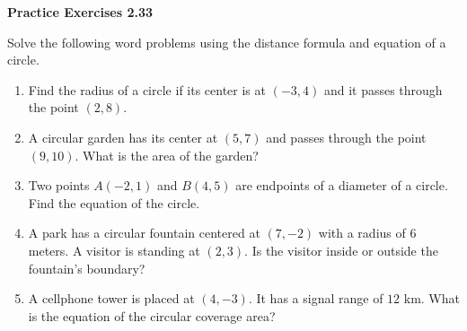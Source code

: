 \vspace{0.3ex}
\noindent\textbf{Practice Exercises 2.33}

\vspace{0.2ex}

Solve the following word problems using the distance formula and equation of a circle.

\begin{enumerate}
    \item Find the radius of a circle if its center is at $(-3,4)$ and it passes through the point $(2,8)$.
    \item A circular garden has its center at $(5,7)$ and passes through the point $(9,10)$. What is the area of the garden?
    \item Two points $A(-2,1)$ and $B(4,5)$ are endpoints of a diameter of a circle. Find the equation of the circle.
    \item A park has a circular fountain centered at $(7,-2)$ with a radius of $6$ meters. A visitor is standing at $(2,3)$. Is the visitor inside or outside the fountain’s boundary?
    \item A cellphone tower is placed at $(4,-3)$. It has a signal range of $12$ km. What is the equation of the circular coverage area?
\end{enumerate}

